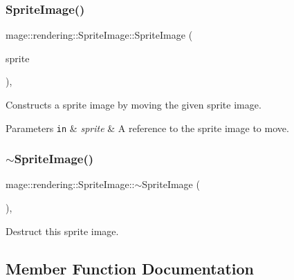 \subsubsection{\texorpdfstring{Sprite\+Image()}{SpriteImage()}\hspace{0.1cm}{\footnotesize\ttfamily [3/3]}}
{\footnotesize\ttfamily mage\+::rendering\+::\+Sprite\+Image\+::\+Sprite\+Image (\begin{DoxyParamCaption}\item[{\mbox{\hyperlink{classmage_1_1rendering_1_1_sprite_image}{Sprite\+Image}} \&\&}]{sprite }\end{DoxyParamCaption})\hspace{0.3cm}{\ttfamily [default]}, {\ttfamily [noexcept]}}

Constructs a sprite image by moving the given sprite image.


\begin{DoxyParams}[1]{Parameters}
\mbox{\tt in}  & {\em sprite} & A reference to the sprite image to move. \\
\hline
\end{DoxyParams}
\mbox{\label{classmage_1_1rendering_1_1_sprite_image_a8723b0d72d07773eb4be1c059c7c1fb9}} 
\subsubsection{\texorpdfstring{$\sim$\+Sprite\+Image()}{~SpriteImage()}}
{\footnotesize\ttfamily mage\+::rendering\+::\+Sprite\+Image\+::$\sim$\+Sprite\+Image (\begin{DoxyParamCaption}{ }\end{DoxyParamCaption})\hspace{0.3cm}{\ttfamily [virtual]}, {\ttfamily [default]}}

Destruct this sprite image. 

\subsection{Member Function Documentation}
\mbox{\label{classmage_1_1rendering_1_1_sprite_image_a0e4e572bae31d431f670895f98a7895e}} 
